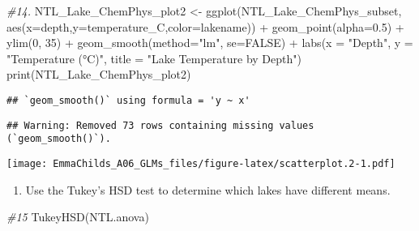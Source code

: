 \documentclass[
]{article}
\newenvironment{Shaded}{\begin{snugshade}}{\end{snugshade}}
\newcommand{\AttributeTok}[1]{\textcolor[rgb]{0.77,0.63,0.00}{#1}}
\newcommand{\CommentTok}[1]{\textcolor[rgb]{0.56,0.35,0.01}{\textit{#1}}}
\newcommand{\ConstantTok}[1]{\textcolor[rgb]{0.00,0.00,0.00}{#1}}
\newcommand{\DecValTok}[1]{\textcolor[rgb]{0.00,0.00,0.81}{#1}}
\newcommand{\FloatTok}[1]{\textcolor[rgb]{0.00,0.00,0.81}{#1}}
\newcommand{\FunctionTok}[1]{\textcolor[rgb]{0.00,0.00,0.00}{#1}}
\newcommand{\NormalTok}[1]{#1}
\newcommand{\OtherTok}[1]{\textcolor[rgb]{0.56,0.35,0.01}{#1}}
\newcommand{\SpecialCharTok}[1]{\textcolor[rgb]{0.00,0.00,0.00}{#1}}
\newcommand{\StringTok}[1]{\textcolor[rgb]{0.31,0.60,0.02}{#1}}
\providecommand{\tightlist}{%
  \setlength{\itemsep}{0pt}\setlength{\parskip}{0pt}}
\begin{document}
\begin{Shaded}
\begin{Highlighting}[]
\CommentTok{\#14.}
\NormalTok{NTL\_Lake\_ChemPhys\_plot2 }\OtherTok{\textless{}{-}}
\FunctionTok{ggplot}\NormalTok{(NTL\_Lake\_ChemPhys\_subset, }\FunctionTok{aes}\NormalTok{(}\AttributeTok{x=}\NormalTok{depth,}\AttributeTok{y=}\NormalTok{temperature\_C,}\AttributeTok{color=}\NormalTok{lakename)) }\SpecialCharTok{+}
  \FunctionTok{geom\_point}\NormalTok{(}\AttributeTok{alpha=}\FloatTok{0.5}\NormalTok{) }\SpecialCharTok{+}
  \FunctionTok{ylim}\NormalTok{(}\DecValTok{0}\NormalTok{, }\DecValTok{35}\NormalTok{) }\SpecialCharTok{+} 
  \FunctionTok{geom\_smooth}\NormalTok{(}\AttributeTok{method=}\StringTok{"lm"}\NormalTok{, }\AttributeTok{se=}\ConstantTok{FALSE}\NormalTok{) }\SpecialCharTok{+}
  \FunctionTok{labs}\NormalTok{(}\AttributeTok{x =} \StringTok{"Depth"}\NormalTok{, }
       \AttributeTok{y =} \StringTok{"Temperature (°C)"}\NormalTok{,}
    \AttributeTok{title =} \StringTok{"Lake Temperature by Depth"}\NormalTok{)}
\FunctionTok{print}\NormalTok{(NTL\_Lake\_ChemPhys\_plot2) }
\end{Highlighting}
\end{Shaded}

\begin{verbatim}
## `geom_smooth()` using formula = 'y ~ x'
\end{verbatim}

\begin{verbatim}
## Warning: Removed 73 rows containing missing values (`geom_smooth()`).
\end{verbatim}

\texttt{[image: EmmaChilds\_A06\_GLMs\_files/figure-latex/scatterplot.2-1.pdf]}

\begin{enumerate}
\def\labelenumi{\arabic{enumi}.}
\setcounter{enumi}{14}
\tightlist
\item
  Use the Tukey's HSD test to determine which lakes have different
  means.
\end{enumerate}

\begin{Shaded}
\begin{Highlighting}[]
\CommentTok{\#15}
\FunctionTok{TukeyHSD}\NormalTok{(NTL.anova)}
\end{Highlighting}
\end{Shaded}
\end{document}
